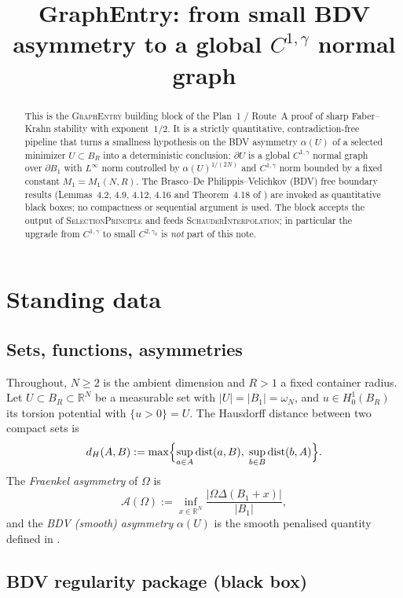 \documentclass[11pt]{article}
\title{GraphEntry: from small BDV asymmetry to a global $C^{1,\gamma}$ normal graph}
\author{}
\date{}
\theoremstyle{definition}
\theoremstyle{remark}
\newcommand{\BB}{B_1}
\newcommand{\dH}{d_H}
\newcommand{\Aa}{\mathcal{A}}
\newcommand{\R}{\mathbb{R}}
\begin{document}
\maketitle

\begin{abstract}
This is the \textsc{GraphEntry} building block of the Plan~1 / Route~A
proof of sharp Faber--Krahn stability with exponent~$1/2$. It is a
strictly quantitative, contradiction-free pipeline that turns a smallness
hypothesis on the BDV asymmetry $\alpha(U)$ of a selected minimizer
$U\subset B_R$ into a deterministic conclusion: $\partial U$ is a global
$C^{1,\gamma}$ normal graph over $\partial\BB$ with $L^\infty$ norm
controlled by $\alpha(U)^{1/(2N)}$ and $C^{1,\gamma}$ norm bounded by a
fixed constant $M_1=M_1(N,R)$. The Brasco--De Philippis--Velichkov (BDV)
free boundary results (Lemmas~4.2, 4.9, 4.12, 4.16 and Theorem~4.18 of
\cite{BDV}) are invoked as quantitative black boxes; no compactness or
sequential argument is used. The block accepts the output of
\textsc{SelectionPrinciple} and feeds \textsc{SchauderInterpolation}; in
particular the upgrade from $C^{1,\gamma}$ to small $C^{2,\gamma_0}$ is
\emph{not} part of this note.
\end{abstract}

\tableofcontents

\section{Standing data}\label{sec:data}

\subsection{Sets, functions, asymmetries}

Throughout, $N\ge2$ is the ambient dimension and $R>1$ a fixed container
radius. Let $U\subset B_R\subset\R^N$ be a measurable set with
$|U|=|\BB|=\omega_N$, and $u\in H^1_0(B_R)$ its torsion potential with
$\{u>0\}=U$. The Hausdorff distance between two compact sets is
\[
\dH(A,B):=\max\Bigl\{\sup_{a\in A}\operatorname{dist}(a,B),\;
\sup_{b\in B}\operatorname{dist}(b,A)\Bigr\}.
\]
The \emph{Fraenkel asymmetry} of $\Omega$ is
\[
\Aa(\Omega):=\inf_{x\in\R^N}\frac{|\Omega\Delta(\BB+x)|}{|\BB|},
\]
and the \emph{BDV (smooth) asymmetry} $\alpha(U)$ is the smooth penalised
quantity defined in \cite[\S4]{BDV}.

\subsection{BDV regularity package (black box)}\label{ssec:BDV}
\end{document}
